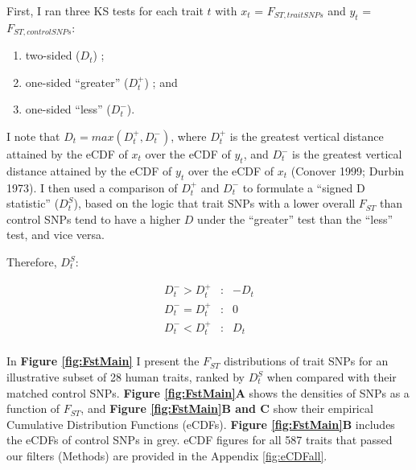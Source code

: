 \documentclass[
]{book}
\begin{document}
First, I ran three KS tests for each trait \(t\) with \(x_t\) = \(F_{ST, trait SNPs}\) and \(y_t\) = \(F_{ST, control SNPs}\):

\begin{enumerate}
\def\labelenumi{\arabic{enumi}.}
\item
  two-sided (\(D_t\)) ;
\item
  one-sided ``greater'' (\(D_t^+\)) ; and
\item
  one-sided ``less'' (\(D_t^-\)).
\end{enumerate}

I note that \(D_{t} = max(D_t^+, D_t^-)\), where \(D_t^+\) is the greatest vertical distance attained by the eCDF of \(x_t\) over the eCDF of \(y_t\), and \(D_t^-\) is the greatest vertical distance attained by the eCDF of \(y_t\) over the eCDF of \(x_t\) (Conover 1999; Durbin 1973). I then used a comparison of \(D_t^+\) and \(D_t^-\) to formulate a ``signed D statistic'' (\(D_t^S\)), based on the logic that trait SNPs with a lower overall \(F_{ST}\) than control SNPs tend to have a higher \(D\) under the ``greater'' test than the ``less'' test, and vice versa.

Therefore, \({D_t^S}\):

\[
\begin{aligned}
D_t^- > D_t^+ &: &-D_t \\
D_t^- = D_t^+ &: &0 \\
D_t^- < D_t^+ &: &D_t \\
\end{aligned}
\]

In \textbf{Figure \ref{fig:FstMain}} I present the \(F_{ST}\) distributions of trait SNPs for an illustrative subset of 28 human traits, ranked by \({D_t^S}\) when compared with their matched control SNPs. \textbf{Figure \ref{fig:FstMain}A} shows the densities of SNPs as a function of \(F_{ST}\), and \textbf{Figure \ref{fig:FstMain}B and C} show their empirical Cumulative Distribution Functions (eCDFs). \textbf{Figure \ref{fig:FstMain}B} includes the eCDFs of control SNPs in grey. eCDF figures for all 587 traits that passed our filters (Methods) are provided in the Appendix \ref{fig:eCDFall}.
\end{document}
